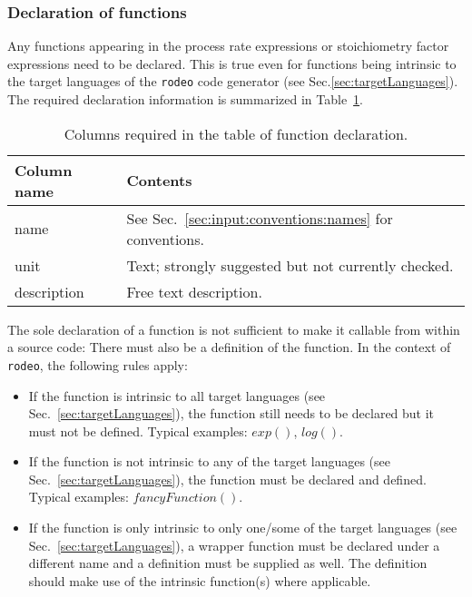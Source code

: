 \documentclass[a4paper]{article}
\newcommand{\rodeo}{\texttt{rodeo}}
\begin{document}
\subsubsection{Declaration of functions} \label{sec:input:tables:funcs}

Any functions appearing in the process rate expressions or stoichiometry factor expressions need to be declared. This is true even for functions being intrinsic to the target languages of the \rodeo{} code generator (see Sec.\ref{sec:targetLanguages}). The required declaration information is summarized in Table~\ref{tab:funs}.

\begin{table}[h!]
  \caption{Columns required in the table of function declaration. \label{tab:funs}}
  \begin{tabular}{lp{}} \hline\hline
    \textbf{Column name} & \textbf{Contents} \\ \hline
    name & See Sec.~\ref{sec:input:conventions:names} for conventions. \\
    unit & Text; strongly suggested but not currently checked. \\
    description & Free text description. \\
    \hline
  \end{tabular}
\end{table}

The sole declaration of a function is not sufficient to make it callable from within a source code: There must also be a definition of the function. In the context of \rodeo{}, the following rules apply:

\begin{itemize}
 \item If the function is intrinsic to all target languages (see Sec.~\ref{sec:targetLanguages}), the function still needs to be declared but it must not be defined. Typical examples: $exp()$, $log()$.
 \item If the function is not intrinsic to any of the target languages (see Sec.~\ref{sec:targetLanguages}), the function must be declared and defined. Typical examples: $fancyFunction()$.
 \item If the function is only intrinsic to only one/some of the target languages (see Sec.~\ref{sec:targetLanguages}), a wrapper function must be declared under a different name and a definition must be supplied as well. The definition should make use of the intrinsic function(s) where applicable.
\end{itemize}
\end{document}
